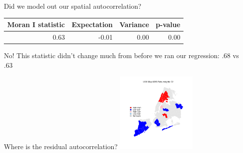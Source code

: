 \documentclass[aspectratio = 169, 12pt]{beamer}\usepackage[]{graphicx}\usepackage[]{color}
\newenvironment{knitrout}{}{} %
\begin{document}
\begin{frame}[fragile]{Did we model out our spatial autocorrelation?}
\begin{table}[ht]
\centering
\begin{tabular}{rrrr}
  \hline
Moran I statistic & Expectation & Variance & p-value \\ 
  \hline
0.63 & -0.01 & 0.00 & 0.00 \\ 
   \hline
\end{tabular}
\label{tab:moranresid}
\end{table}

No!  This statistic didn't change much from before we ran our regression: $.68$ vs $.63$
\end{frame}

\begin{frame}[fragile]{Where is the residual autocorrelation?}
\begin{knitrout}\tiny
{}\color{fgcolor}
\includegraphics[width=150px]{figure/unnamed-chunk-11-1} 

\end{knitrout}
\end{frame}
\end{document}
